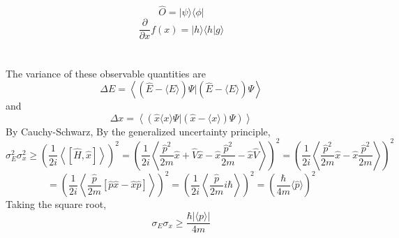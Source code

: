 \documentclass{article}
\begin{document}
\section{}

\[
  \hat{O}=|\psi\rangle\langle \phi|
\]
\[
  \frac{\partial}{\partial x}f(x)=|h\rangle\langle h|g \rangle
\]

\section{}
The variance of these observable quantities are
\[
  \Delta E =\left\langle \left( \hat{E}-\langle E \rangle \right)\Psi\bigg|\left( \hat{E}-\langle E \rangle \right)\Psi  \right\rangle
\]
and
\[
  \Delta x=\left\langle \left( \hat{x}\langle x \rangle\Psi\bigg|\left( \hat{x}-\langle x \rangle \right)\Psi \right)\right \rangle
\]
By Cauchy-Schwarz,
By the generalized uncertainty principle,
\[
  \sigma_{E}^{2}\sigma_{x}^{2}\geq\left( \frac{1}{2i}\left\langle \left[ \hat{H},\hat{x} \right] \right\rangle \right)^{2}
  =\left( \frac{1}{2i}\left\langle \frac{\hat{p}^{2}}{2m}\hat{x}+\hat{V}\hat{x}-\hat{x}\frac{\hat{p}^{2}}{2m}
      -\hat{x}\hat{V} \right\rangle \right)^{2}
  =\left( \frac{1}{2i}\left\langle\frac{\hat{p}^{2}}{2m}\hat{x}-\hat{x}\frac{\hat{p}^{2}}{2m}\right\rangle \right)^{2}
\]
\[
  =\left(  \frac{1}{2i}\left\langle\frac{\hat{p}}{2m}\left[\hat{p}\hat{x}-\hat{x}\hat{p} \right] \right\rangle\right)^{2}
  =\left( \frac{1}{2i}\left\langle\frac{\hat{p}}{2m}i\hbar \right\rangle \right)^{2}
  =\left( \frac{\hbar}{4m}\langle \hat{p} \rangle\right)^{2}
\]
Taking the square root,
\[\sigma_{E}\sigma_{x}\geq \frac{\hbar|\langle p \rangle|}{4m}\]
\end{document}
